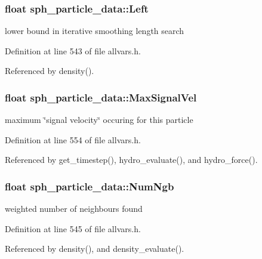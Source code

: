 \hypertarget{structsph__particle__data_a05d75ccc7dbd52562b7211fc74e674af}{
\subsubsection[{Left}]{\setlength{\rightskip}{0pt plus 5cm}float {\bf sph\_\-particle\_\-data::Left}}}
\label{structsph__particle__data_a05d75ccc7dbd52562b7211fc74e674af}
lower bound in iterative smoothing length search 

Definition at line 543 of file allvars.h.



Referenced by density().

\hypertarget{structsph__particle__data_a86da008875968dfca41b35f4ca7f3164}{
\subsubsection[{MaxSignalVel}]{\setlength{\rightskip}{0pt plus 5cm}float {\bf sph\_\-particle\_\-data::MaxSignalVel}}}
\label{structsph__particle__data_a86da008875968dfca41b35f4ca7f3164}
maximum \char`\"{}signal velocity\char`\"{} occuring for this particle 

Definition at line 554 of file allvars.h.



Referenced by get\_\-timestep(), hydro\_\-evaluate(), and hydro\_\-force().

\hypertarget{structsph__particle__data_a8038c8b4be4a553e5c13c9b9e711c5c0}{
\subsubsection[{NumNgb}]{\setlength{\rightskip}{0pt plus 5cm}float {\bf sph\_\-particle\_\-data::NumNgb}}}
\label{structsph__particle__data_a8038c8b4be4a553e5c13c9b9e711c5c0}
weighted number of neighbours found 

Definition at line 545 of file allvars.h.



Referenced by density(), and density\_\-evaluate().

